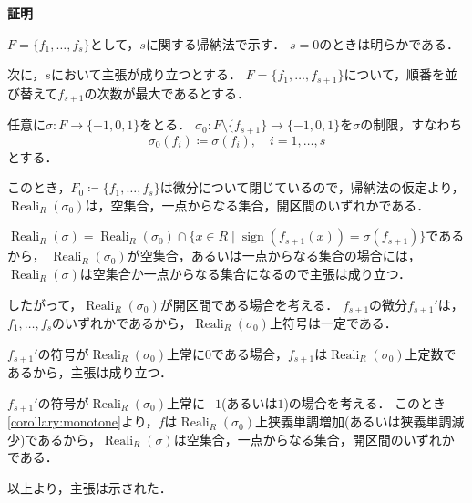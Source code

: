 \documentclass[uplatex, dvipdfmx]{jsarticle}
\makeatletter
\numberwithin{equation}{section}
\renewenvironment{proof}[1][\proofname]{\par
  \pushQED{\qed}%
  \normalfont \topsep6\p@\@plus6\p@\relax
  \trivlist
  \item\relax
  {\bfseries
  #1\@addpunct{.}}\hspace\labelsep\ignorespaces
}{
  \popQED\endtrivlist\@endpefalse
}
\newcommand{\map}[3]{{#1}\colon{#2}\rightarrow{#3}}
\DeclareMathOperator{\Reali}{Reali}
\DeclareMathOperator{\sign}{sign}
\theoremstyle{definition}
\renewcommand{\proofname}{\textbf{証明}}
\makeatother
\begin{document}
\begin{proof}
     $F = \{f_1, \dots, f_s\}$として，$s$に関する帰納法で示す．
     $s = 0$のときは明らかである．
     
     次に，$s$において主張が成り立つとする．
     $F = \{f_1, \dots, f_{s+1}\}$について，順番を並び替えて$f_{s+1}$の次数が最大であるとする．

     任意に$\map{\sigma}{F}{\{-1,0,1\}}$をとる．
     $\map{\sigma_0}{F \setminus \{f_{s+1}\}}{\{-1,0,1\}}$を$\sigma$の制限，すなわち
     \begin{equation}
          \sigma_0(f_i) \coloneqq \sigma(f_i), \quad i=1, \dots, s
     \end{equation}
     とする．

     このとき，$F_0 \coloneqq \{f_1, \dots, f_{s}\}$は微分について閉じているので，帰納法の仮定より，
     $\Reali_R(\sigma_0)$は，空集合，一点からなる集合，開区間のいずれかである．

     $\Reali_R(\sigma) = \Reali_R({\sigma_0}) \cap \{x \in R \mid \sign(f_{s+1}(x)) = \sigma(f_{s+1})\}$であるから，
     $\Reali_R({\sigma_0})$が空集合，あるいは一点からなる集合の場合には，$\Reali_R(\sigma)$は空集合か一点からなる集合になるので主張は成り立つ．

     したがって，$\Reali_R({\sigma_0})$が開区間である場合を考える．
     $f_{s+1}$の微分$f_{s+1}'$は，$f_1, \dots, f_s$のいずれかであるから，$\Reali_R({\sigma_0})$上符号は一定である．

     $f_{s+1}'$の符号が$\Reali_R({\sigma_0})$上常に$0$である場合，$f_{s+1}$は$\Reali_R({\sigma_0})$上定数であるから，主張は成り立つ．

     $f_{s+1}'$の符号が$\Reali_R({\sigma_0})$上常に$-1$(あるいは$1$)の場合を考える．
     このとき\cref{corollary:monotone}より，$f$は$\Reali_R({\sigma_0})$上狭義単調増加(あるいは狭義単調減少)であるから，$\Reali_R(\sigma)$は空集合，一点からなる集合，開区間のいずれかである．

     以上より，主張は示された．
\end{proof}
\end{document}
